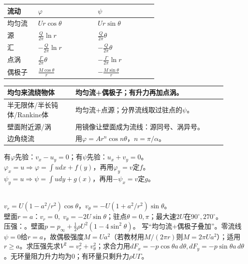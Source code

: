 \renewcommand{\arraystretch}{0.76}\begin{tabular}{|p{0.18\linewidth}|p{0.35\linewidth}|p{0.35\linewidth}|}
\hline 流动 & $\varphi$ & $\psi$\\ \hline
均匀流 & $Ur\cos\theta$ & $Ur\sin\theta$\\ \hline
源 & $\frac{Q}{2\pi}\ln r$ & $\frac{Q}{2\pi}\theta$\\ \hline
汇 & $-\frac{Q}{2\pi}\ln r$ & $-\frac{Q}{2\pi}\theta$\\ \hline
点涡 & $\frac{\Gamma}{2\pi}\theta$ & $-\frac{\Gamma}{2\pi}\ln r$\\ \hline
偶极子 & $\frac{M\cos\theta}{r}$ & $-\frac{M\sin\theta}{r}$\\ \hline
\end{tabular}\renewcommand{\arraystretch}{1}
\renewcommand{\arraystretch}{0.70}\begin{tabular}{|p{0.28\linewidth}|p{0.62\linewidth}|}
\hline 均匀来流绕物体 & 均匀流+偶极子；有升力再加点涡。\\ \hline
半无限体/半长钝体/Rankine体 & 均匀流+点源；分界流线取过驻点的$\psi$。\\ \hline
壁面附近源/涡 & 用镜像让壁面成为流线：源同号、涡异号。\\ \hline
边角绕流 & 用$\varphi=Ar^n\cos n\theta$，$n=\pi/\alpha$。\\ \hline
\end{tabular}\renewcommand{\arraystretch}{1}

有$\varphi$先验：$v_x-u_y=0$；有$\psi$先验：$u_x+v_y=0$。\\
$\varphi_x=u\Rightarrow \varphi=\int u dx+f(y)$，再用$\varphi_y=v$定$f$。\\
$\psi_y=u\Rightarrow \psi=\int u dy+g(x)$，再用$-\psi_x=v$定$g$。

\\
$v_r=U(1-a^2/r^2)\cos\theta$，$v_\theta=-U(1+a^2/r^2)\sin\theta$。\\
壁面$r=a$：$v_r=0,\;v_\theta=-2U\sin\theta$；驻点$\theta=0,\pi$；最大速$2U$在$90^\circ,270^\circ$。\\
压强：。壁面$p=p_\infty+\frac12\rho U^2(1-4\sin^2\theta)$。
写“均匀流+偶极子叠加”。零流线$\psi=0$给$r=a$，故偶极强度$M=Ua^2$（若教材用$M/(2\pi r)$则$M=2\pi Ua^2$）；适用$r\ge a$。求压强先求$V^2=v_r^2+v_\theta^2$；求合力用$dF_x=-p\cos\theta a\,d\theta,dF_y=-p\sin\theta a\,d\theta$。无环量阻力升力均为0；有环量只剩升力$\rho U\Gamma$。

